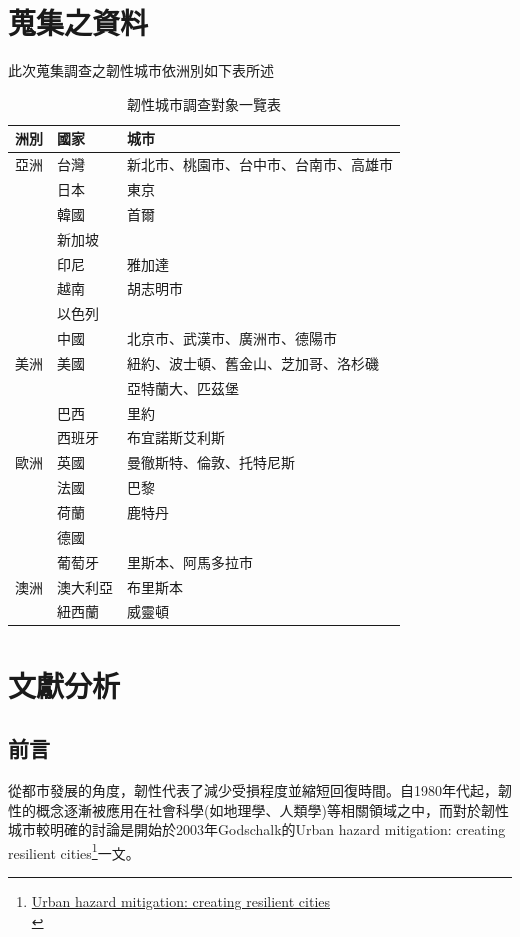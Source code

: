 \documentclass[a4paper,12pt]{article}
\begin{document}
\section{蒐集之資料}
\label{sec:org53a1b4e}
此次蒐集調查之韌性城市依洲別如下表所述\\
\begin{table}[htbp]
\caption{\label{table2}韌性城市調查對象一覽表}
\centering
\begin{tabular}{lll}
\hline
洲別 & 國家 & 城市\\
\hline
亞洲 & 台灣 & 新北市、桃園市、台中市、台南市、高雄市\\
 & 日本 & 東京\\
 & 韓國 & 首爾\\
 & 新加坡 & \\
 & 印尼 & 雅加達\\
 & 越南 & 胡志明市\\
 & 以色列 & \\
 & 中國 & 北京市、武漢市、廣洲市、德陽市\\
\hline
美洲 & 美國 & 紐約、波士頓、舊金山、芝加哥、洛杉磯\\
 &  & 亞特蘭大、匹茲堡\\
 & 巴西 & 里約\\
 & 西班牙 & 布宜諾斯艾利斯\\
\hline
歐洲 & 英國 & 曼徹斯特、倫敦、托特尼斯\\
 & 法國 & 巴黎\\
 & 荷蘭 & 鹿特丹\\
 & 德國 & \\
 & 葡萄牙 & 里斯本、阿馬多拉市\\
\hline
澳洲 & 澳大利亞 & 布里斯本\\
 & 紐西蘭 & 威靈頓\\
\hline
\end{tabular}
\end{table}
\newpage

\section{文獻分析}
\label{sec:orgc893c52}

\subsection{前言}
\label{sec:org1f4cc60}

從都市發展的角度，韌性代表了減少受損程度並縮短回復時間。自1980年代起，韌性的概念逐漸被應用在社會科學(如地理學、人類學)等相關領域之中，而對於韌性城市較明確的討論是開始於2003年Godschalk的Urban hazard mitigation: creating resilient cities\footnote{\href{https://www.google.com/url?sa=t\&rct=j\&q=\&esrc=s\&source=web\&cd=\&ved=2ahUKEwjRxsnV27HvAhVzNKYKHSaxDwIQFjADegQIBhAD\&url=https\%3A\%2F\%2Fweb.ntpu.edu.tw\%2F\~slchan\%2Ffile\_old\%2F1\_6.pdf\&usg=AOvVaw1s7kZBhbLaYSAx6XBRwm7P}{Urban hazard mitigation: creating resilient cities}\\}一文。\\
\end{document}
